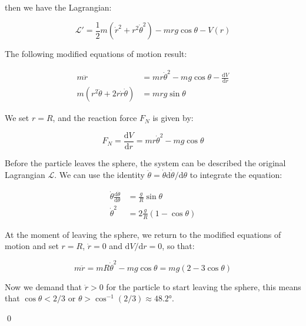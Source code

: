 \documentclass[12pt]{article}
\begin{document}
then we have the Lagrangian:

\begin{equation}
    \mathcal{L}' = \frac{1}{2} m (\dot{r}^{2} + r^{2} \dot{\theta}^{2}) - mrg \cos{\theta} - V(r)
\end{equation}

The following modified equations of motion result:

\begin{equation}
\begin{split}
    m\ddot{r} &= mr \dot{\theta}^{2} - mg \cos{\theta} - \frac{\mathrm{d}V}{\mathrm{d}r} \\
    m (r^{2} \ddot{\theta} + 2r \dot{r} \dot{\theta}) &= mrg \sin{\theta}
\end{split}
\end{equation}

We set $r = R$, and the reaction force $F_{N}$ is given by:

\begin{equation}
    F_{N} = \frac{\mathrm{d}V}{\mathrm{d}r} = mr \dot{\theta}^{2} - mg \cos{\theta}
\end{equation}

Before the particle leaves the sphere, the system can be described the original Lagrangian $\mathcal{L}$. We can use the identity $\ddot{\theta} = \dot{\theta} \mathrm{d}\dot{\theta}/\mathrm{d}\theta$ to integrate the equation:

\begin{equation}
\begin{split}
    \dot{\theta} \frac{\mathrm{d}\dot{\theta}}{\mathrm{d}\theta} &= \frac{g}{R} \sin{\theta} \\
    \dot{\theta}^{2} &= 2\frac{g}{R} (1 - \cos{\theta})
\end{split}
\end{equation}

At the moment of leaving the sphere, we return to the modified equations of motion and set $r = R$, $\dot{r} = 0$ and $\mathrm{d}V/\mathrm{d}r = 0$, so that:

\begin{equation}
    m\ddot{r} = mR \dot{\theta}^{2} - mg \cos{\theta} = mg(2 - 3\cos{\theta})
\end{equation}

Now we demand that $\ddot{r} > 0$ for the particle to start leaving the sphere, this means that $\cos{\theta} < 2/3$ or $\theta > \cos^{-1}{(2/3)} \approx \ang{48.2}$.

\qed
\end{document}
